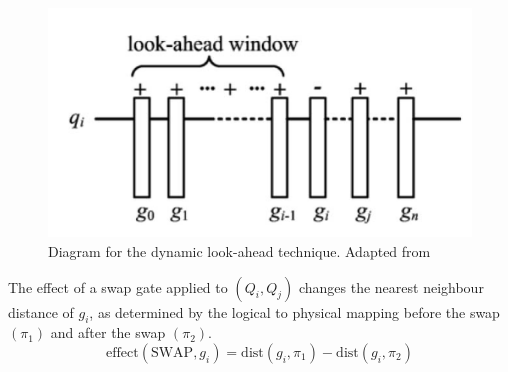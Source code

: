 \begin{figure}[h]
    \centering
    \includegraphics[width=0.5\linewidth]{image/lookahead_window.png}
    \caption{Diagram for the dynamic look-ahead technique. Adapted from \cite{zhu_dynamic_2020}}
    \label{fig:lookahead-window}
\end{figure}

The effect of a swap gate applied to $(Q_i, Q_j)$ changes the nearest neighbour distance of $g_i$, as determined by the logical to physical mapping before the swap $(\pi_1)$ and after the swap $(\pi_2)$.
\begin{equation}
    \text{effect}(\text{SWAP}, g_i) = \text{dist}(g_i, \pi_1) - \text{dist}(g_i, \pi_2)
\end{equation}


